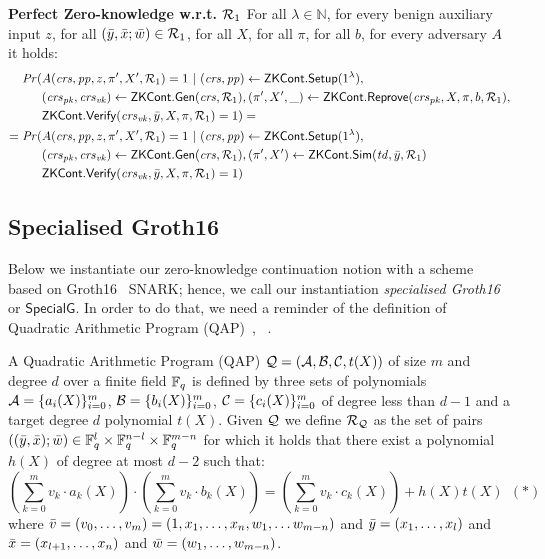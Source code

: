 \begin{definition}[ZK Continuations]
\noindent \textbf{Perfect Zero-knowledge w.r.t. $\mathcal{R}_1$} For all $\lambda \in \mathbb{N}$, for every benign auxiliary input $z$, 
for all  $(\bar{y}, \bar{x}; \bar{w}) \in \mathcal{R}_1$, for all $X$, for all $\pi$, for all $b$, for every adversary $A$ it holds:
\begin{align*}
\mathit{Pr}(& A(\mathit{crs}, \mathit{pp}, z, \pi', X', \mathcal{R}_1) = 1 \ | \ (\mathit{crs}, \mathit{pp}) \leftarrow {\ensuremath{\mathsf{ZKCont}}}.{\mathsf{Setup}} (1^{\lambda}), \\
                  & (\mathit{crs}_{\mathit{pk}}, \mathit{crs}_{\mathit{vk}}) \leftarrow {\ensuremath{\mathsf{ZKCont}}}.\mathsf{Gen}(\mathit{crs}, \mathcal{R}_1), (\pi', X', \_) \leftarrow {\ensuremath{\mathsf{ZKCont}}}.{\mathsf{Reprove}} (\mathit{crs}_{\mathit{pk}}, X, \pi, b, \mathcal{R}_1), \\
                  &  {\mathsf{ZKCont}}.{\mathsf{Verify}}(\mathit{crs}_{\mathit{vk}}, \bar{y}, X, \pi, \mathcal{R}_1) = 1) =  \\
= \mathit{Pr}(& A(\mathit{crs}, \mathit{pp}, z, \pi', X', \mathcal{R}_1) = 1 \ | \ (\mathit{crs}, \mathit{pp}) \leftarrow {\ensuremath{\mathsf{ZKCont}}}.{\mathsf{Setup}} (1^{\lambda}), \\ 
                     & (\mathit{crs}_{\mathit{pk}}, \mathit{crs}_{\mathit{vk}}) \leftarrow {\ensuremath{\mathsf{ZKCont}}}.\mathsf{Gen}(\mathit{crs}, \mathcal{R}_1), (\pi', X') \leftarrow {\ensuremath{\mathsf{ZKCont}}}.{\mathsf{Sim}}(\mathit{td}, \bar{y}, \mathcal{R}_1) \\ 
                     &  {\mathsf{ZKCont}}.{\mathsf{Verify}}(\mathit{crs}_{\mathit{vk}}, \bar{y}, X, \pi, \mathcal{R}_1) = 1)
\end{align*}
 
\end{definition} 


\subsection{Specialised Groth16}
\label{sec:rvrf_groth16}

Below we instantiate our zero-knowledge continuation notion with a scheme based on Groth16~\cite{Groth16} SNARK;
hence, we call our instantiation \emph{specialised Groth16} or \emph{$\mathsf{SpecialG}$}. In order to do that, we need a 
reminder of the definition of Quadratic Arithmetic Program (QAP)~\cite{LegoSNARK}, ~\cite{GGPR13}.

\begin{definition}[QAP] 
\label{def:QAP}
A Quadratic Arithmetic Program (QAP) $\mathcal{Q} = (\mathcal{A}, \mathcal{B}, \mathcal{C}, t(X))$ of size $m$ 
and degree $d$ over a finite field $\mathbb{F}_q$ is defined by three sets of polynomials $\mathcal{A} = \{a_i(X)\}_{i=0}^m$, 
$\mathcal{B} = \{b_i(X)\}_{i=0}^m$, $\mathcal{C} = \{c_i(X)\}_{i=0}^m$ of degree less than $d-1$ and a target degree $d$ polynomial $t(X)$. Given 
$\mathcal{Q}$ we define $\mathcal{R}_{\mathcal{Q}}$ as the set of pairs $((\bar{y}, \bar{x}); \bar{w}) \in \mathbb{F}_q^{l} \times \mathbb{F}_q^{n-l} \times \mathbb{F}_q^{m-n}$ for which it 
holds that there exist a polynomial $h(X)$ of degree at most $d-2$ such that:
$$(\sum_{k=0}^m v_k \cdot a_k(X)) \cdot (\sum_{k=0}^m v_k \cdot b_k(X)) = (\sum_{k=0}^m v_k \cdot c_k(X)) + h(X)t(X) \ \ (\ast)$$ 
where $\bar{v} = (v_0, \ldots, v_m) = (1, x_1, \ldots, x_n, w_1, \ldots w_{m-n})$ and $\bar{y} = (x_1, \ldots, x_l)$ and 
$\bar{x} = (x_{l+1}, \ldots, x_n)$ and $\bar{w} = (w_1, \ldots, w_{m-n})$. 
\end{definition}

